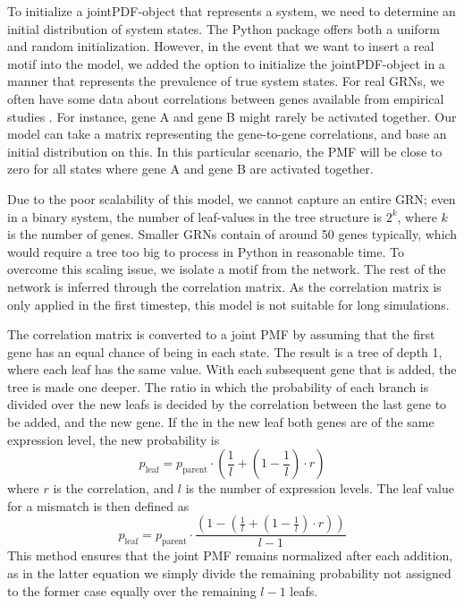 \documentclass[../main.tex]{subfiles}
\begin{document}
To initialize a jointPDF-object that represents a system, we need to determine an initial distribution of system states.
The Python package offers both a uniform and random initialization.
However, in the event that we want to insert a real motif into the model, we added the option to initialize the jointPDF-object in a manner that represents the prevalence of true system states.
For real GRNs, we often have some data about correlations between genes available from empirical studies \cite{}.
For instance, gene A and gene B might rarely be activated together.
Our model can take a matrix representing the gene-to-gene correlations, and base an initial distribution on this.
In this particular scenario, the PMF will be close to zero for all states where gene A and gene B are activated together.

Due to the poor scalability of this model, we cannot capture an entire GRN; even in a binary system, the number of leaf-values in the tree structure is $2^k$, where $k$ is the number of genes.
Smaller GRNs contain of around 50 genes typically, which would require a tree too big to process in Python in reasonable time.
To overcome this scaling issue, we isolate a motif from the network.
The rest of the network is inferred through the correlation matrix.
As the correlation matrix is only applied in the first timestep, this model is not suitable for long simulations.

The correlation matrix is converted to a joint PMF by assuming that the first gene has an equal chance of being in each state.
The result is a tree of depth 1, where each leaf has the same value.
With each subsequent gene that is added, the tree is made one deeper.
The ratio in which the probability of each branch is divided over the new leafs is decided by the correlation between the last gene to be added, and the new gene.
If the in the new leaf both genes are of the same expression level, the new probability is
%
\begin{equation}
    p_\mathrm{leaf} = p_\mathrm{parent} \cdot (\frac{1}{l} + (1 - \frac{1}{l}) \cdot r)
\end{equation}
%
where $r$ is the correlation, and $l$ is the number of expression levels.
The leaf value for a mismatch is then defined as
%
\begin{equation}
    p_\mathrm{leaf} = p_\mathrm{parent} \cdot \frac{(1 - (\frac{1}{l} + (1 - \frac{1}{l}) \cdot r))}{l-1} 
\end{equation}
%
This method ensures that the joint PMF remains normalized after each addition, as in the latter equation we simply divide the remaining probability not assigned to the former case equally over the remaining $l-1$ leafs.
\end{document}
